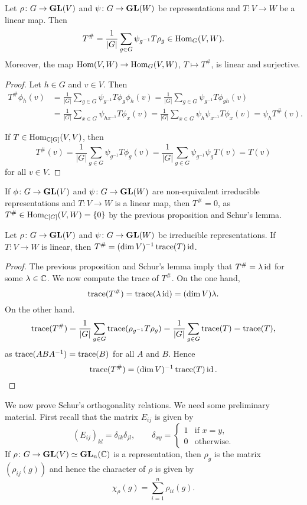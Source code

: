 \begin{proposition}
	Let $\rho\colon G\to\mathbf{GL}(V)$ and $\psi\colon G\to\mathbf{GL}(W)$ be representations
	and $T\colon V\to W$ be a linear map. Then
	\[
	T^{\#}=\frac{1}{|G|}\sum_{g\in G}\psi_{g^{-1}}T\rho_g\in\operatorname{Hom}_G(V,W).
	\]
	Moreover, the map $\operatorname{Hom}(V,W)\to\operatorname{Hom}_G(V,W)$, $T\mapsto T^{\#}$, is linear and surjective.  
\end{proposition}

\begin{proof}
  Let $h\in G$ and $v\in V$. Then 
  \begin{align*}
	T^{\#}\phi_h(v)
	&=\frac{1}{|G|}\sum_{g\in G}\psi_{g^{-1}}T\phi_g\phi_h(v)
	=\frac{1}{|G|}\sum_{g\in G}\psi_{g^{-1}}T\phi_{gh}(v)\\
	&=\frac{1}{|G|}\sum_{x\in G}\psi_{hx^{-1}}T\phi_x(v)
	=\frac{1}{|G|}\sum_{x\in G}\psi_h\psi_{x^{-1}}T\phi_x(v)
	=\psi_hT^{\#}(v).
      \end{align*}

	  If $T\in\operatorname{Hom}_{\mathbb{C}[G]}(V,V)$, then 
      \[
	T^{\#}(v)=\frac{1}{|G|}\sum_{g\in G}\psi_{g^{-1}}T\phi_g(v)
	=\frac{1}{|G|}\sum_{g\in G}\psi_{g^{-1}}\psi_gT(v)
	=T(v)
      \]
      for all $v\in V$.
\end{proof}

If $\phi\colon G\to\mathbf{GL}(V)$ and $\psi\colon
	G\to\mathbf{GL}(W)$ are non-equivalent irreducible representations and $T\colon
	V\to W$ is a linear map, then $T^{\#}=0$, as 
	$T^{\#}\in\operatorname{Hom}_{\mathbb{C}[G]}(V,W)=\{0\}$ by the previous proposition and Schur's lemma.

\begin{theorem}
  Let $\rho\colon G\to\mathbf{GL}(V)$ and $\psi\colon G\to\mathbf{GL}(W)$ be irreducible representations. 
  If $T\colon V\to W$ is linear, then 
  $T^{\#}=(\dim V)^{-1}\operatorname{trace}(T)\operatorname{id}$.
\end{theorem}

\begin{proof}
  The previous proposition and Schur's lemma imply that
  $T^{\#}=\lambda\operatorname{id}$ for some $\lambda\in\mathbb{C}$.
  We now compute the trace of $T^{\#}$. On the one hand, 
  \[
	\operatorname{trace}(T^{\#})=\operatorname{trace}(\lambda\operatorname{id})=(\dim V)\lambda.
  \]
  On the other hand.  
  \[
	\operatorname{trace}(T^{\#})
	=\frac{1}{|G|}\sum_{g\in G}\operatorname{trace}(\rho_{g^{-1}}T\rho_g)
	=\frac{1}{|G|}\sum_{g\in G}\operatorname{trace}(T)
	=\operatorname{trace}(T),
  \]
  as $\operatorname{trace}(ABA^{-1})=\operatorname{trace}(B)$ for all $A$ and $B$. 
  Hence 
  \[
  \operatorname{trace}(T^{\#})=(\dim V)^{-1}\operatorname{trace}(T)\operatorname{id}.\qedhere 
  \]
\end{proof}

We now prove Schur's orthogonality relations. We need some preliminary material. First recall that 
the matrix $E_{ij}$ is given by 
\[
(E_{ij})_{kl}=\delta_{ik}\delta_{jl},
\qquad
\delta_{xy}=\begin{cases}
    1 & \text{if $x=y$},\\
    0 & \text{otherwise}.
\end{cases}
\]
If $\rho\colon G\to\mathbf{GL}(V)\simeq\mathbf{GL}_n(\mathbb{C})$ is a representation, then
$\rho_g$ is the matrix $(\rho_{ij}(g))$ and hence the character of $\rho$ is given by
\[
\chi_\rho(g)=\sum_{i=1}^n\rho_{ii}(g).
\]

